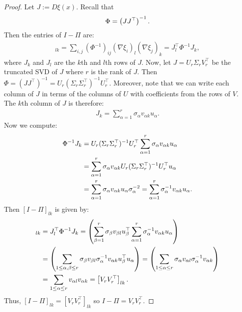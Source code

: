 \documentclass[10pt,a4paper]{amsart}
\begin{document}
\begin{proof}
    Let $J := D\xi(x)$. 
    Recall that 
    \begin{align}
        \Phi = \left(JJ^{\top}\right)^{-1}. \notag
    \end{align}
    Then the entries of $I-\Pi$ are:
    \begin{align}
        [I - \Pi]_{lk} = \sum_{i,j} (\Phi^{-1})_{ij} (\nabla \xi_i)_{l} (\nabla \xi_j)_{k} = J^{\top}_{l}\Phi^{-1}J_{k}, %
    \end{align}
    where $J_k$ and $ J_l$ are the $k$th and $l$th rows of $J$. Now, let $J = U_{r}\Sigma_{r}V^{\top}_{r}$ be the truncated SVD of $J$ where $r$ is the rank of $J$. Then $\Phi = \left(JJ^{\top}\right)^{-1} = U_{r}(\Sigma_{r}\Sigma_{r}^{\top})^{-1}U^{\top}_{r}$. Moreover, note that we can write each column of $J$ in terms of the columns of $U$ with coefficients from the rows of $V$. The $k$th column of $J$ is therefore:
    \begin{align}
        J_k = \sum_{\alpha=1}^{r}\sigma_{\alpha}v_{\alpha k}u_{\alpha}. 
    \end{align}
    Now we compute:
    \begin{align}
        \Phi^{-1}J_{k} &= U_{r}(\Sigma_{r}\Sigma_{r}^{\top})^{-1}U^{\top}_{r}\sum_{\alpha=1}^{r}\sigma_{\alpha}v_{\alpha k}u_{\alpha} \\
        &= \sum_{\alpha=1}^{r}\sigma_{\alpha}v_{\alpha k}U_{r}(\Sigma_{r}\Sigma_{r}^{\top})^{-1}U^{\top}_{r}u_{\alpha} \notag\\
        &= \sum_{\alpha=1}^{r}\sigma_{\alpha}v_{\alpha k}u_{\alpha}\sigma_{\alpha}^{-2} = \sum_{\alpha=1}^{r}\sigma_{\alpha}^{-1}v_{\alpha k}u_{\alpha}. \notag
    \end{align}
    Then $[I- \Pi]_{lk}$ is given by:  
    \begin{align}
 [I - \Pi]_{lk} &= J^{\top}_{l}\Phi^{-1}J_{k} = 
        \left(\sum_{\beta=1}^{r}\sigma_{\beta}v_{\beta l}u_{\beta}^{\top}\sum_{\alpha=1}^{r}\sigma_{\alpha}^{-1}v_{\alpha k}u_{\alpha}\right) \\
        &= \left(\sum_{1 \leq \alpha,\beta \leq r}\sigma_{\beta}v_{\beta l}\sigma_{\alpha}^{-1}v_{\alpha k}u_{\beta}^{\top}u_{\alpha}\right) = \left(\sum_{1 \leq \alpha \leq r}\sigma_{\alpha}v_{\alpha l}\sigma_{\alpha}^{-1}v_{\alpha k}\right) \notag\\
        &= \sum_{1 \leq \alpha \leq r}v_{\alpha l}v_{\alpha k} = \left[V_{r}V_{r}^{\top}\right]_{lk}. \notag
    \end{align}
    Thus, $[I - \Pi]_{lk} = \left[V_{r}V_{r}^{\top}\right]_{lk}$ so $I - \Pi = V_{r}V_{r}^{\top}$. 
    

\end{proof}
\end{document}
